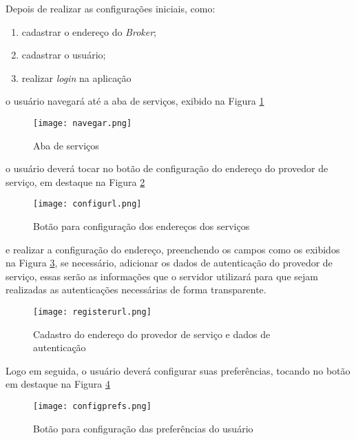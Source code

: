 Depois de realizar as configurações iniciais, como:
\begin{enumerate}
  \item cadastrar o endereço do \textit{Broker};
  \item cadastrar o usuário;
  \item realizar \textit{login} na aplicação
\end{enumerate}

o usuário navegará até a aba de serviços, exibido na Figura \ref{fig:navegar}

\begin{figure}[!htb]
  \centering
  \texttt{[image: navegar.png]} %
  \caption[Aba de serviços]{Aba de serviços}
  \label{fig:navegar}
\end{figure}

o usuário deverá tocar no botão de configuração do endereço do provedor de serviço, em destaque na Figura \ref{fig:configurl}

\begin{figure}[!htb]
  \centering
  \texttt{[image: configurl.png]} %
  \caption[Botão para configuração dos endereços dos serviços]{Botão para configuração dos endereços dos serviços}
  \label{fig:configurl}
\end{figure}

e realizar a configuração do endereço, preenchendo os campos como os exibidos na Figura \ref{fig:registerurl}, se necessário, adicionar os dados de autenticação do provedor de serviço, essas serão as informações que o servidor utilizará para que sejam realizadas as autenticações necessárias de forma transparente.

\begin{figure}[!htb]
  \centering
  \texttt{[image: registerurl.png]} %
  \caption[Cadastro do endereço do provedor de serviço e dados de autenticação]{Cadastro do endereço do provedor de serviço e dados de autenticação}
  \label{fig:registerurl}
\end{figure}

Logo em seguida, o usuário deverá configurar suas preferências, tocando no botão em destaque na Figura \ref{fig:configprefs}

\begin{figure}[!htb]
  \centering
  \texttt{[image: configprefs.png]} %
  \caption[Botão para configuração das preferências do usuário]{Botão para configuração das preferências do usuário}
  \label{fig:configprefs}
\end{figure}

